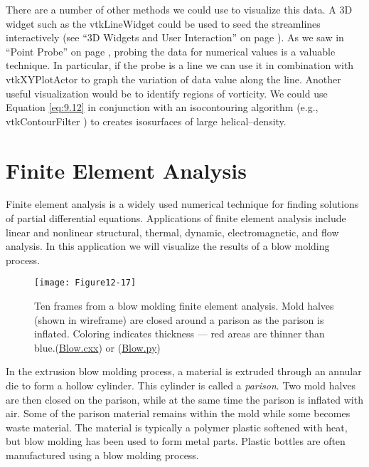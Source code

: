 \noindent There are a number of other methods we could use to visualize this data. A 3D widget such as the vtkLineWidget could be used to seed the streamlines interactively (see ``3D Widgets and User Interaction'' on page \pageref{sec:3D_widgets_user_interaction}). As we saw in ``Point Probe'' on page \pageref{subsec:examples.point_probe}, probing the data
for numerical values is a valuable technique. In particular, if the probe is a line we can use it in combination with vtkXYPlotActor to graph the variation of data value along the line. Another useful visualization would be to identify regions of vorticity. We could use Equation \ref{eq:9.12} in conjunction with an isocontouring algorithm (e.g., vtkContourFilter ) to creates isosurfaces of large helical--density. 

\section{Finite Element Analysis}

Finite element analysis is a widely used numerical technique for finding solutions of partial differential equations. Applications of finite element analysis include linear and nonlinear structural, thermal, dynamic, electromagnetic, and flow analysis. In this application we will visualize the results of a blow molding process.

\begin{figure}[!htb]
    \centering
    \texttt{[image: Figure12-17]}
    \caption{Ten frames from a blow molding finite element analysis. Mold halves (shown in wireframe) are closed around a parison as the parison is inflated. Coloring indicates thickness --- red areas are thinner than blue.(\href{https://lorensen.github.io/VTKExamples/site/Cxx/Visualization/Blow/}{Blow.cxx}) or (\href{https://lorensen.github.io/VTKExamples/site/Python/Visualization/Blow/}{Blow.py})}
    \label{fig:Figure12-17}
\end{figure}

In the extrusion blow molding process, a material is extruded through an annular die to form a hollow cylinder. This cylinder is called a \emph{parison}. Two mold halves are then closed on the parison, while at the same time the parison is inflated with air. Some of the parison material remains within the mold while some becomes waste material. The material is typically a polymer plastic softened with heat, but blow molding has been used to form metal parts. Plastic bottles are often manufactured using a blow molding process.

